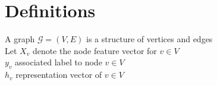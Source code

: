 % 

\chapter{Definitions}

A graph $\mathcal G = (V, E)$ is a structure of vertices and edges\\
Let $ X_{v} $ denote the node feature vector for $v\in V$\\

$y_{v}$ \rightarrow associated label to node $v\in V$\\
$h_{v}$ \rightarrow representation vector of $v\in V$\\


